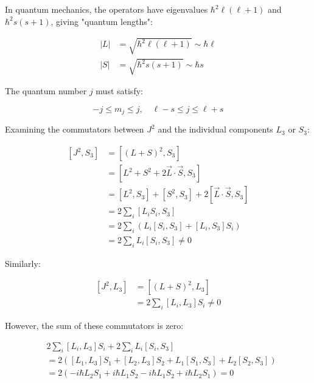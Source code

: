 In quantum mechanics, the operators have eigenvalues $\hbar^{2}\ell(\ell+1)$ and $\hbar^{2}s(s+1)$, giving "quantum lengths":

\begin{align}
|L| &= \sqrt{\hbar^{2} \ell(\ell+1)} \sim \hbar \ell  \\
|S| &= \sqrt{\hbar^{2} s(s+1)} \sim \hbar s
\end{align}

The quantum number $j$ must satisfy:

\begin{equation}
-j \leq m_{j} \leq j, \quad \ell-s \leq j \leq \ell+s
\end{equation}

Examining the commutators between $J^2$ and the individual components $L_3$ or $S_3$:

\begin{align}
\left[J^{2}, S_{3}\right] &= \left[(L+S)^{2}, S_{3}\right]\\
&= \left[L^{2}+S^{2}+2 \vec{L} \cdot \vec{S}, S_{3}\right]\\
&= \left[L^{2}, S_{3}\right]+\left[S^{2}, S_{3}\right]+2\left[\vec{L} \cdot \vec{S}, S_{3}\right]\\
&= 2 \sum_{i}\left[L_{i} S_{i}, S_{3}\right]\\
&= 2 \sum_{i}\left(L_{i}\left[S_{i}, S_{3}\right]+\left[L_{i}, S_{3}\right] S_{i}\right)\\
&= 2 \sum_{i} L_{i}\left[S_{i}, S_{3}\right] \neq 0
\end{align}

Similarly:

\begin{align}
\left[J^{2}, L_{3}\right] &= \left[(L+S)^{2}, L_{3}\right]\\
&= 2 \sum_{i}\left[L_{i}, L_{3}\right] S_{i} \neq 0
\end{align}

However, the sum of these commutators is zero:

\begin{align}
&2 \sum_{i}\left[L_{i}, L_{3}\right] S_{i}+2 \sum_{i} L_{i}\left[S_{i}, S_{3}\right]\\
&= 2\left(\left[L_{1}, L_{3}\right] S_{1}+\left[L_{2}, L_{3}\right] S_{2}+L_{1}\left[S_{1}, S_{3}\right]+L_{2}\left[S_{2}, S_{3}\right]\right)\\
&= 2\left(-i \hbar L_{2} S_{1}+i \hbar L_{1} S_{2}-i \hbar L_{1} S_{2}+i \hbar L_{2} S_{1}\right)=0
\end{align}

